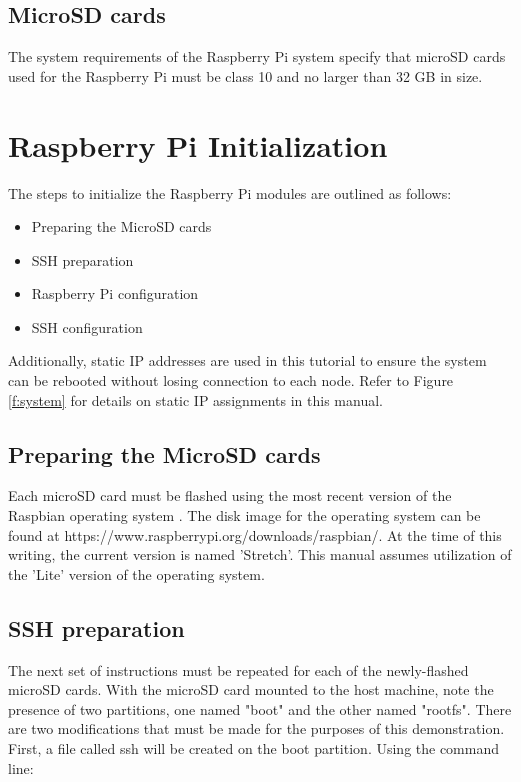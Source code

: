 \documentclass[sigconf]{acmart}
\begin{document}
\subsection{MicroSD cards}

The system requirements of the Raspberry Pi system specify that microSD cards used for the Raspberry Pi must be class 10 and 
no larger than 32 GB in size.

\section{Raspberry Pi Initialization}

The steps to initialize the Raspberry Pi modules are outlined as follows:

\begin{itemize}
  \setlength{\parskip}{1em}\item Preparing the MicroSD cards
  \setlength{\parskip}{1em}\item SSH preparation
  \setlength{\parskip}{1em}\item Raspberry Pi configuration
  \setlength{\parskip}{1em}\item SSH configuration
\end{itemize}

Additionally, static IP addresses are used in this tutorial to ensure the system can be rebooted without losing connection 
to each node. Refer to Figure \ref{f:system} for details on static IP assignments in this manual.

\subsection{Preparing the MicroSD cards}

Each microSD card must be flashed using the most recent version of the Raspbian operating system \cite{raspbian2018}. The 
disk image for the operating system can be found at https://www.raspberrypi.org/downloads/raspbian/. At the time of this 
writing, the current version is named 'Stretch'. This manual assumes utilization of the 'Lite' version of the operating 
system.

\subsection{SSH preparation}

The next set of instructions must be repeated for each of the newly-flashed microSD cards. With the microSD card mounted to 
the host machine, note the presence of two partitions, one named "boot" and the other named "rootfs". There are two 
modifications that must be made for the purposes of this demonstration. First, a file called ssh will be created on the boot 
partition. Using the command line:
\end{document}
